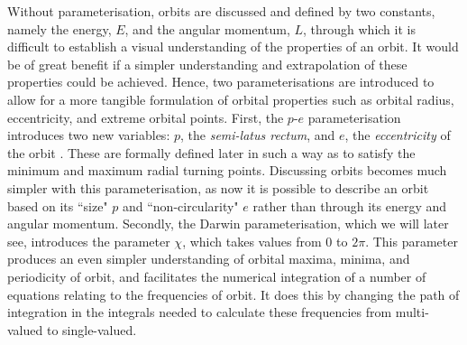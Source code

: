 Without parameterisation, orbits are discussed and defined by two constants, namely the energy, $E$, and the angular momentum, $L$, through which it is difficult to establish a visual understanding of the properties of an orbit.
It would be of great benefit if a simpler understanding and extrapolation of these properties could be achieved.
Hence, two parameterisations are introduced to allow for a more tangible formulation of orbital properties such as orbital radius, eccentricity, and extreme orbital points.
First, the $p$-$e$ parameterisation introduces two new variables: $p$, the \textit{semi-latus rectum}, and $e$, the \textit{eccentricity} of the orbit \cite{cutlerEtAl}.
These are formally defined later in such a way as to satisfy the minimum and maximum radial turning points.
Discussing orbits becomes much simpler with this parameterisation, as now it is possible to describe an orbit based on its ``size" $p$ and ``non-circularity" $e$ rather than through its energy and angular momentum.
Secondly, the Darwin parameterisation, which we will later see, introduces the parameter $\chi$, which takes values from $0$ to $2\pi$.
This parameter produces an even simpler understanding of orbital maxima, minima, and periodicity of orbit, and facilitates the numerical integration of a number of equations relating to the frequencies of orbit.
It does this by changing the path of integration in the integrals needed to calculate these frequencies from multi-valued to single-valued.



